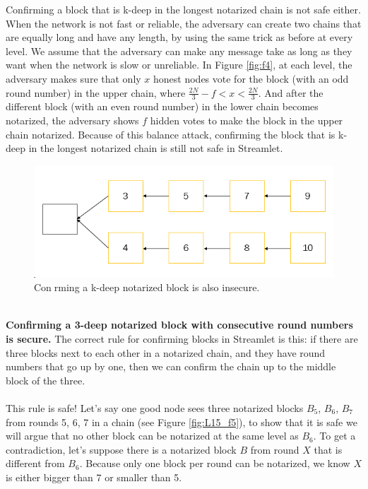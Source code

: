 Confirming a block that is k-deep in the longest notarized chain is not safe either. When the network is not fast or reliable, the adversary can create two chains that are equally long and have any length, by using the same trick as before at every level. We assume that the adversary can make any message take as long as they want when the network is slow or unreliable. In Figure \ref{fig:f4}, at each level, the adversary makes sure that only $x$ honest nodes vote for the block (with an odd round number) in the upper chain, where  $\frac{2N}{3}-f < x < \frac{2N}{3}$. And after the different block (with an even round number) in the lower chain becomes notarized, the adversary shows $f$ hidden votes to make the block in the upper chain notarized. Because of this balance attack, confirming the block that is k-deep in the longest notarized chain is still not safe in Streamlet.
\begin{figure}[h!]
	\centering
	\includegraphics[width=0.5\linewidth]{Fig/L15_F4}
	\caption{Conrming a k-deep notarized block is also insecure.}
	\label{fig:L15_f4}
\end{figure}\\
\textbf{Confirming a 3-deep notarized block with consecutive round numbers is secure.} The correct rule for confirming blocks in Streamlet is this: if there are three blocks next to each other in a notarized chain, and they have round numbers that go up by one, then we can confirm the chain up to the middle block of the three.\\\\
This rule is safe! Let’s say one good node sees three notarized blocks $B_5$, $B_6$, $B_7$ from rounds 5, 6, 7 in a chain (see Figure \ref{fig:L15_f5}), to show that it is safe we will argue that no other block can be notarized at the same level as $B_6$. To get a contradiction, let’s suppose there is a notarized block $B$ from round $X$ that is different from $B_6$. Because only one block per round can be notarized, we know $X$ is either bigger than 7 or smaller than 5.
